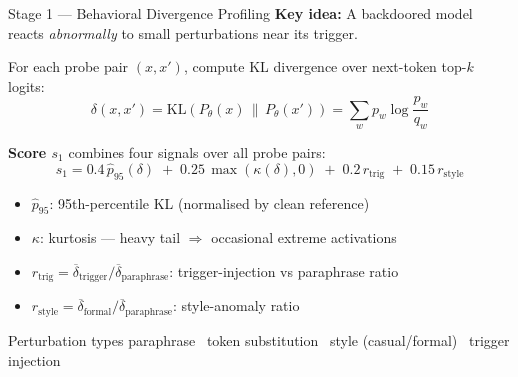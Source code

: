 \documentclass[aspectratio=169]{beamer}
\begin{document}
\begin{frame}{Stage 1 --- Behavioral Divergence Profiling}
\textbf{Key idea:} A backdoored model reacts \emph{abnormally} to small perturbations near its trigger.

\vspace{0.4em}
For each probe pair $(x, x')$, compute KL divergence over next-token top-$k$ logits:
\[
  \delta(x,x') = \mathrm{KL}\!\left(P_\theta(x) \,\|\, P_\theta(x')\right)
  = \sum_{w} p_w \log \frac{p_w}{q_w}
\]

\vspace{0.3em}
\textbf{Score $s_1$} combines four signals over all probe pairs:
\[
  s_1 = 0.4\,\hat{p}_{95}(\delta) \;+\; 0.25\,\max(\kappa(\delta),0) \;+\; 0.2\,r_{\text{trig}} \;+\; 0.15\,r_{\text{style}}
\]
\begin{itemize}
  \item $\hat{p}_{95}$: 95th-percentile KL (normalised by clean reference)
  \item $\kappa$: kurtosis --- heavy tail $\Rightarrow$ occasional extreme activations
  \item $r_{\text{trig}} = \overline{\delta}_{\text{trigger}} / \overline{\delta}_{\text{paraphrase}}$: trigger-injection vs paraphrase ratio
  \item $r_{\text{style}} = \overline{\delta}_{\text{formal}} / \overline{\delta}_{\text{paraphrase}}$: style-anomaly ratio
\end{itemize}

\vspace{0.2em}
\begin{block}{Perturbation types}
  paraphrase \textbullet\ token substitution \textbullet\ style (casual/formal) \textbullet\ trigger injection
\end{block}
\end{frame}
\end{document}
